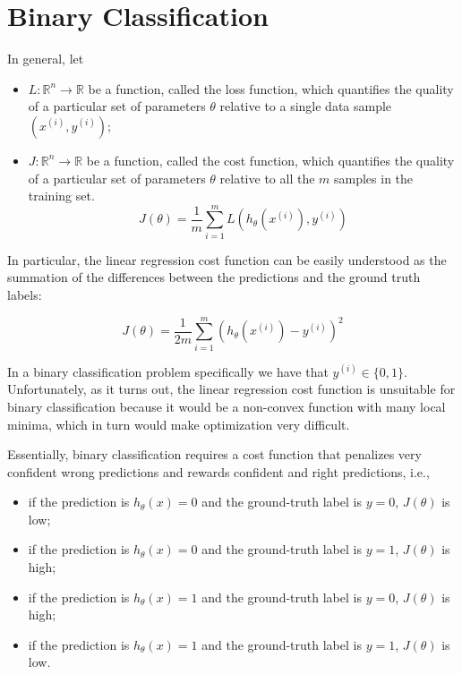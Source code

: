 \section{Binary Classification}

In general, let

\begin{itemize}
    \item $L \colon \mathbb{R}^n \to \mathbb{R}$ be a function, called the loss function, which quantifies the quality of a particular set of parameters $\theta$ relative to a single data sample $(x^{(i)}, y^{(i)})$;
    \item $J \colon \mathbb{R}^n \to \mathbb{R}$ be a function, called the cost function, which quantifies the quality of a particular set of parameters $\theta$ relative to all the $m$ samples in the training set. $$J(\theta) = \frac{1}{m} \sum_{i=1}^{m} L(h_{\theta}(x^{(i)}), y^{(i)})$$
\end{itemize}

In particular, the linear regression cost function can be easily understood as the summation of the differences between the predictions and the ground truth labels:

$$
J(\theta) = \frac{1}{2m} \sum_{i=1}^{m} (h_{\theta}(x^{(i)}) - y^{(i)})^2
$$

In a binary classification problem specifically we have that $y^{(i)} \in \{0, 1\}$. Unfortunately, as it turns out, the linear regression cost function is unsuitable for binary classification because it would be a non-convex function with many local minima, which in turn would make optimization very difficult.

Essentially, binary classification requires a cost function that penalizes very confident wrong predictions and rewards confident and right predictions, i.e.,

\begin{itemize}
    \item if the prediction is $h_{\theta}(x) = 0$ and the ground-truth label is $y = 0$, $J(\theta)$ is low;
    \item if the prediction is $h_{\theta}(x) = 0$ and the ground-truth label is $y = 1$, $J(\theta)$ is high;
    \item if the prediction is $h_{\theta}(x) = 1$ and the ground-truth label is $y = 0$, $J(\theta)$ is high;
    \item if the prediction is $h_{\theta}(x) = 1$ and the ground-truth label is $y = 1$, $J(\theta)$ is low.
\end{itemize}

